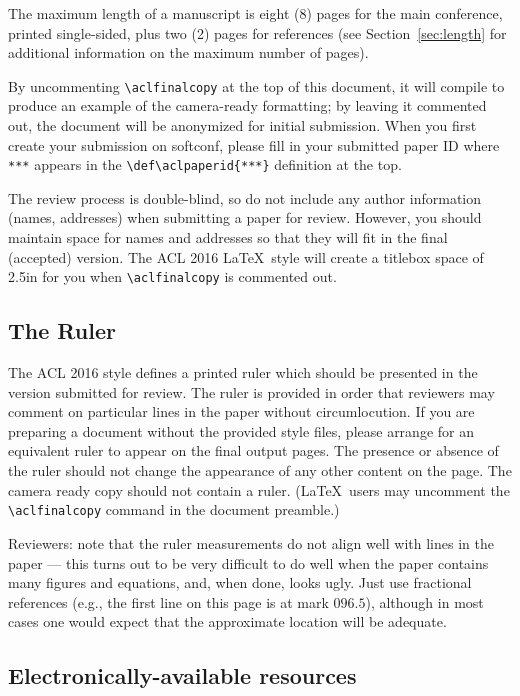 \documentclass[11pt]{article}
\begin{document}
The maximum length of a manuscript is eight (8) pages for the main
conference, printed single-sided, plus two (2) pages for references
(see Section~\ref{sec:length} for additional information on the
maximum number of pages). 

By uncommenting {\small\verb|\aclfinalcopy|} at the top of this 
 document, it will compile to produce an example of the camera-ready formatting; by leaving it commented out, the document will be anonymized for initial submission.  When you first create your submission on softconf, please fill in your submitted paper ID where {\small\verb|***|} appears in the {\small\verb|\def\aclpaperid{***}|} definition at the top.

The review process is double-blind, so do not include any author information (names, addresses) when submitting a paper for review.  
However, you should maintain space for names and addresses so that they will fit in the final (accepted) version.  The ACL 2016 \LaTeX\ style will create a titlebox space of 2.5in for you when {\small\verb|\aclfinalcopy|} is commented out.  

\subsection{The Ruler}
The ACL 2016 style defines a printed ruler which should be presented in the
version submitted for review.  The ruler is provided in order that
reviewers may comment on particular lines in the paper without
circumlocution.  If you are preparing a document without the provided
style files, please arrange for an equivalent ruler to
appear on the final output pages.  The presence or absence of the ruler
should not change the appearance of any other content on the page.  The
camera ready copy should not contain a ruler. (\LaTeX\ users may uncomment
the {\small\verb|\aclfinalcopy|} command in the document preamble.)  

Reviewers:
note that the ruler measurements do not align well with lines in the paper
--- this turns out to be very difficult to do well when the paper contains
many figures and equations, and, when done, looks ugly.  Just use fractional
references (e.g., the first line on this page is at mark $096.5$), although in most cases one would
expect that the approximate location will be adequate.

\subsection{Electronically-available resources}
\end{document}
